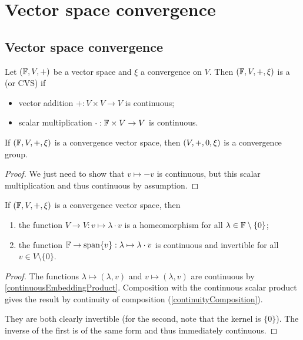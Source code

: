 \chapter{Vector space convergence}

\section{Vector space convergence}
\begin{definition}
Let $\left( \mathbb{F},V,+ \right)$ be a vector space and $\xi$ a convergence on $V$. Then $\left( \mathbb{F},V,+, \xi \right)$ is a  (or CVS) if
\begin{itemize}
\item vector addition $+: V\times V \to V$ is continuous;
\item scalar multiplication $\cdot: \mathbb{F}\times V \to V$ is continuous.
\end{itemize}
\end{definition}

\begin{lemma}
If $\left( \mathbb{F},V,+, \xi \right)$ is a convergence vector space, then $\left( V,+, 0, \xi \right)$ is a convergence group.
\end{lemma}
\begin{proof}
We just need to show that $v\mapsto -v$ is continuous, but this scalar multiplication and thus continuous by assumption.
\end{proof}

\begin{lemma} \label{continuityLemmaVectorConvergence}
If $\left( \mathbb{F},V,+, \xi \right)$ is a convergence vector space, then
\begin{enumerate}
\item the function $V \to V: v \mapsto \lambda\cdot v$ is a homeomorphism for all $\lambda\in \mathbb{F}\setminus\{0\}$;
\item the function $\mathbb{F} \to \operatorname{span}\{v\}: \lambda \mapsto \lambda\cdot v$ is continuous and invertible for all $v\in V\setminus\{0\}$.
\end{enumerate}
\end{lemma}
\begin{proof}
The functions $\lambda \mapsto (\lambda, v)$ and $v \mapsto (\lambda, v)$ are continuous by \ref{continuousEmbeddingProduct}. Composition with the continuous scalar product gives the result by continuity of composition (\ref{continuityComposition}).

They are both clearly invertible (for the second, note that the kernel is $\{0\}$). The inverse of the first is of the same form and thus immediately continuous.
\end{proof}


